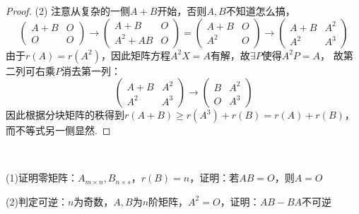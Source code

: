 \begin{proof}
  (2)
  注意从复杂的一侧$A+B$开始，否则$A,B$不知道怎么搞，
  \begin{equation*}
    \left(
      \begin{array}{cc}
        A+B&O\\
        O&O
      \end{array}
    \right) \rightarrow \left(
      \begin{array}{cc}
        A+B&O\\
        A^2 + AB&O
      \end{array}
    \right) = \left(
      \begin{array}{cc}
        A+B&O\\
        A^2&O
      \end{array}
    \right)  \rightarrow \left(
      \begin{array}{cc}
        A+B&A^2\\
        A^2&A^3
      \end{array}
    \right)
  \end{equation*}
  由于$r(A) = r(A^2)$，因此矩阵方程$A^2X = A$有解，故$\exists P$使得$A^2P = A$，
  故第二列可右乘$P$消去第一列：
  \begin{equation*}
    \left(
      \begin{array}{cc}
        A+B&A^2\\
        A^2&A^3
      \end{array}
    \right) \rightarrow \left(
      \begin{array}{cc}
        B&A^2\\
        O&A^3
      \end{array}
    \right)
  \end{equation*}
  因此根据分块矩阵的秩得到$r(A + B) \geq r(A^3) + r(B) = r(A) + r(B)$，
  而不等式另一侧显然.
\end{proof}


~

\begin{exercise}[用秩不等式研究矩阵性质]
  (1)证明零矩阵：$A_{m \times n}, B_{n \times s}$，$r(B) = n$，证明：若$AB = O$，则$A = O$

  (2)判定可逆：$n$为奇数，$A,B$为$n$阶矩阵，$A^2 = O$，证明：$AB - BA$不可逆

\end{exercise}

